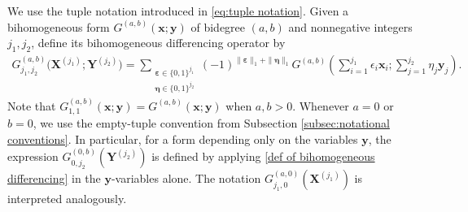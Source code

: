 \documentclass[12pt,reqno]{amsart}
\theoremstyle{definition}
\theoremstyle{remark}
\numberwithin{equation}{section}
\def\bfx{{\mathbf x}}
\def\bfy{{\mathbf y}}
\def\bfX{{\mathbf X}}
\def\bfY{{\mathbf Y}}
\def\bfeta{{\boldsymbol \eta}} \def\Eta{{\mathrm H}}
\def\bfeps{{\boldsymbol \varepsilon}}
\begin{document}
We use the tuple notation introduced in \eqref{eq:tuple notation}. Given a bihomogeneous form
$G^{(a,b)}(\bfx;\bfy)$ of bidegree $(a,b)$ and nonnegative integers
$j_1,j_2$, define its bihomogeneous differencing operator by
\begin{equation}\label{def of bihomogeneous differencing}
\begin{aligned}
G^{(a,b)}_{j_1,j_2}
    \bigl(\bfX^{(j_1)};\bfY^{(j_2)}\bigr)  =
\sum_{\substack{\bfeps\in\{0,1\}^{j_1}\\
                 \bfeta\in\{0,1\}^{j_2}}}
(-1)^{\|\bfeps\|_1+\|\bfeta\|_1}
G^{(a,b)}
\left(
    \sum_{i=1}^{j_1}\epsilon_i\bfx_i;
    \sum_{j=1}^{j_2}\eta_j\bfy_j
\right).
\end{aligned}
\end{equation}
Note that $G^{(a,b)}_{1,1}(\bfx;\bfy)=G^{(a,b)}(\bfx;\bfy)$ when $a,b>0$.
Whenever $a=0$ or $b=0$, we use the empty-tuple convention from Subsection
\ref{subsec:notational conventions}. In particular, for a form depending
only on the variables $\bfy$, the expression $G^{(0,b)}_{0,j_2}(\bfY^{(j_2)})$ is
defined by applying \eqref{def of bihomogeneous differencing} in the
$\bfy$-variables alone. The notation
$G^{(a,0)}_{j_1,0}(\bfX^{(j_1)})$ is interpreted analogously.
\end{document}

